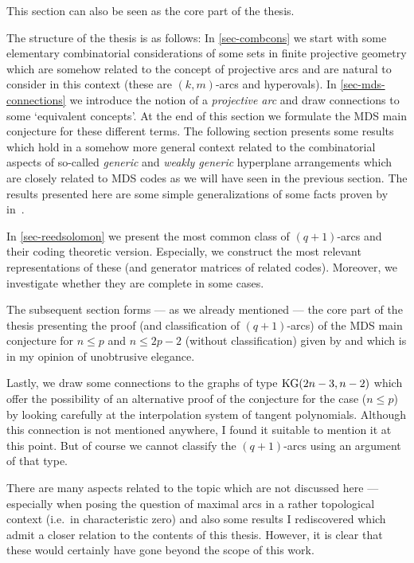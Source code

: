 This section can also be seen as the core part of the thesis.

The structure of the thesis is as follows:
In \autoref{sec-combcons} we start with some elementary combinatorial considerations of some sets in finite projective geometry which are somehow related to the concept of projective arcs and are natural to consider in this context (these are $(k,m)$-arcs and hyperovals).
In \autoref{sec-mds-connections} we introduce the notion of a \emph{projective arc} and draw connections to some `equivalent concepts'. At the end of this section we formulate the MDS main conjecture for these different terms.
The following section presents some results which hold in a somehow more general context related to the combinatorial aspects of so-called \emph{generic} and \emph{weakly generic} hyperplane arrangements which are closely related to MDS codes as we will have seen in the previous section. The results presented here are some simple generalizations of some facts proven by  in~\cite{zas}.

In \autoref{sec-reedsolomon} we present the most common class of $(q+1)$-arcs and their coding theoretic version.
Especially, we construct the most relevant representations of these (and generator matrices of related codes).
Moreover, we investigate whether they are complete in some cases.

The subsequent section forms --- as we already mentioned --- the core part of the thesis presenting the proof (and classification of $(q+1)$-arcs) of the MDS main conjecture for $n\leq p$ and $n\leq 2p-2$ (without classification) given by  and  which is in my opinion of unobtrusive elegance.

Lastly, we draw some connections to the  graphs of type $\mathop\mathrm{KG}(2n-3,n-2)$ which offer the possibility of an alternative proof of the conjecture for the case ($n\leq p$) by looking carefully at the interpolation system of tangent polynomials. Although this connection is not mentioned anywhere, I found it suitable to mention it at this point. But of course we cannot classify the $(q+1)$-arcs using an argument of that type.

There are many aspects related to the topic which are not discussed here --- especially when posing the question of maximal arcs in a rather topological context (i.e.~in characteristic zero) and also some results I rediscovered which admit a closer relation to the contents of this thesis. However, it is clear that these would certainly have gone beyond the scope of this work.

